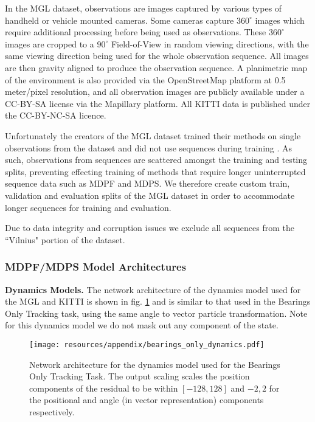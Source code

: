         In the MGL dataset, observations are images captured by various types of handheld or vehicle mounted cameras. Some cameras capture $360^{\circ}$ images which require additional processing before being used as observations.  These $360^{\circ}$ images are cropped to a $90^{\circ}$ Field-of-View in random viewing directions, with the same viewing direction being used for the whole observation sequence. All images are then gravity aligned to produce the observation sequence.   A planimetric map of the environment is also provided via the OpenStreetMap platform \cite{OpenStreetMap} at 0.5 meter/pixel resolution, and all observation images are publicly available under a CC-BY-SA license via the Mapillary platform.  All KITTI data is published under the CC-BY-NC-SA licence. 

        Unfortunately the creators of the MGL dataset trained their methods on single observations from the dataset and did not use sequences during training \cite{sarlin2023orienternet}. As such, observations from sequences are scattered amongst the training and testing splits, preventing effecting training of methods that require longer uninterrupted sequence data such as MDPF and MDPS.  We therefore create custom train, validation and evaluation splits of the MGL dataset in order to accommodate longer sequences for training and evaluation.

        Due to data integrity and corruption issues we exclude all sequences from the ``Vilnius" portion of the dataset.


    \subsubsection{MDPF/MDPS Model Architectures}

        \textbf{Dynamics Models.} The network architecture of the dynamics model used for the MGL and KITTI is shown in fig. \ref{appx_fig:mapillary_dynamics} and is similar to that used in the Bearings Only Tracking task, using the same angle to vector particle transformation.  Note for this dynamics model we do not mask out any component of the state.

        \begin{figure}[ht]
            \centering
            \texttt{[image: resources/appendix/bearings\_only\_dynamics.pdf]}
            \caption{\small{Network architecture for the dynamics model used for the Bearings Only Tracking Task. The output scaling scales the position components of the residual to be within $[-128, 128]$ and $-2, 2$ for the positional and angle (in vector representation) components respectively.}}
            \label{appx_fig:mapillary_dynamics}
        \end{figure}


